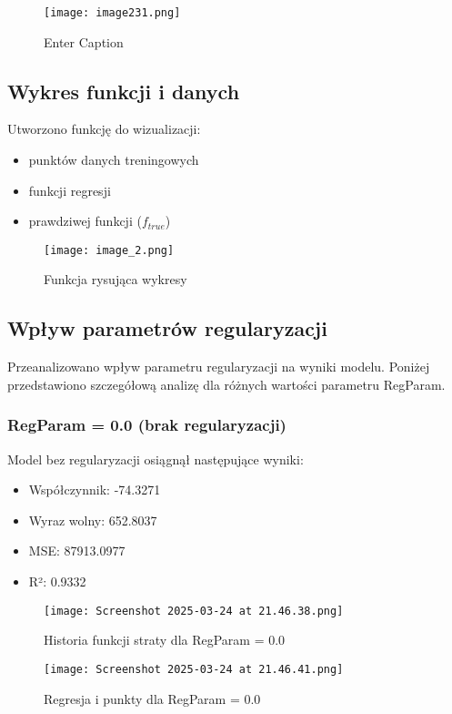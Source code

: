 \documentclass{article}
\begin{document}
\begin{figure}
    \centering
    \texttt{[image: image231.png]}
    \caption{Enter Caption}
    \label{fig:enter-label}
\end{figure}

\subsection{Wykres funkcji i danych}
Utworzono funkcję do wizualizacji:
\begin{itemize}
    \item punktów danych treningowych
    \item funkcji regresji
    \item prawdziwej funkcji ($f_{true}$)
\end{itemize}

\begin{figure}[H]
    \centering
    \texttt{[image: image\_2.png]}
    \caption{Funkcja rysująca wykresy}
    \label{fig:enter-label}
\end{figure}

\subsection{Wpływ parametrów regularyzacji}
Przeanalizowano wpływ parametru regularyzacji na wyniki modelu. Poniżej przedstawiono szczegółową analizę dla różnych wartości parametru RegParam.

\subsubsection{RegParam = 0.0 (brak regularyzacji)}
Model bez regularyzacji osiągnął następujące wyniki:
\begin{itemize}
    \item Współczynnik: -74.3271
    \item Wyraz wolny: 652.8037
    \item MSE: 87913.0977
    \item R²: 0.9332
\end{itemize}

\begin{figure}[H]
    \centering
    \begin{minipage}{0.45\textwidth}
        \texttt{[image: Screenshot 2025-03-24 at 21.46.38.png]}
        \caption{Historia funkcji straty dla RegParam = 0.0}
    \end{minipage}
    \hfill
    \begin{minipage}{0.45\textwidth}
        \texttt{[image: Screenshot 2025-03-24 at 21.46.41.png]}
        \caption{Regresja i punkty dla RegParam = 0.0}
    \end{minipage}
\end{figure}
\end{document}
